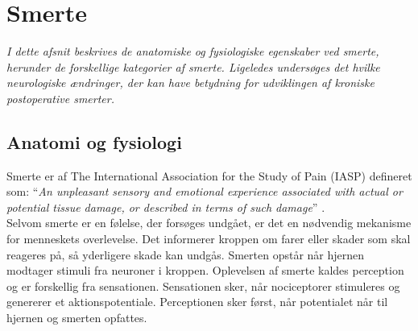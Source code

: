 \section{Smerte}
\textit{I dette afsnit beskrives de anatomiske og fysiologiske egenskaber ved smerte, herunder de forskellige kategorier af smerte. Ligeledes undersøges det hvilke neurologiske ændringer, der kan have betydning for udviklingen af kroniske postoperative smerter.}

\subsection{Anatomi og fysiologi}
Smerte er af The International Association for the Study of Pain (IASP) defineret som: “\textit{An unpleasant sensory and emotional experience associated with actual or potential tissue damage, or described in terms of such damage}” \citep{Carmon}.\\
Selvom smerte er en følelse, der forsøges undgået, er det en nødvendig mekanisme for menneskets overlevelse. Det informerer kroppen om farer eller skader som skal reageres på, så yderligere skade kan undgås.
Smerten opstår når hjernen modtager stimuli fra neuroner i kroppen. Oplevelsen af smerte kaldes perception og er forskellig fra sensationen. Sensationen sker, når nociceptorer stimuleres og genererer et aktionspotentiale. Perceptionen sker først, når potentialet når til hjernen og smerten opfattes. \citep{Martini2012}

